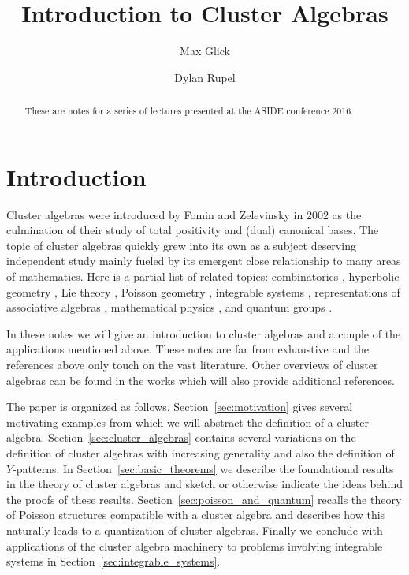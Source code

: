 \documentclass{amsart}
\title{Introduction to Cluster Algebras}
\author{Max Glick}
\author{Dylan Rupel}
\theoremstyle{definition}
\theoremstyle{remark}
\numberwithin{equation}{section}
\begin{document}
\begin{abstract}
  These are notes for a series of lectures presented at the ASIDE conference 2016.
\end{abstract}
\maketitle

\section{Introduction}
  Cluster algebras were introduced by Fomin and Zelevinsky \cite{FZ02} in 2002 as the culmination of their study of total positivity \cite{FZ99} and (dual) canonical bases.  The topic of cluster algebras quickly grew into its own as a subject deserving independent study mainly fueled by its emergent close relationship to many areas of mathematics.  Here is a partial list of related topics: combinatorics \cite{MP07}, hyperbolic geometry \cite{FG06,FST08,MSW13}, Lie theory \cite{GLS06}, Poisson geometry \cite{GSV03}, integrable systems \cite{dFK10,G11}, representations of associative algebras \cite{CC06,CK06,BMRRT06,R11,Q12,R15}, mathematical physics \cite{EF12,ABCGPT14}, and quantum groups \cite{K12,GLS13,KQ14,BR15}.

  In these notes we will give an introduction to cluster algebras and a couple of the applications mentioned above.  These notes are far from exhaustive and the references above only touch on the vast literature.  Other overviews of cluster algebras can be found in the works \cite{K10,W13,GLS} which will also provide additional references.

  The paper is organized as follows.  Section~\ref{sec:motivation} gives several motivating examples from which we will abstract the definition of a cluster algebra.  %
	Section~\ref{sec:cluster_algebras} contains several variations on the definition of cluster algebras with increasing generality and also the definition of $Y$-patterns.  In Section~\ref{sec:basic_theorems} we describe the foundational results in the theory of cluster algebras and sketch or otherwise indicate the ideas behind the proofs of these results. Section~\ref{sec:poisson_and_quantum} recalls the theory of Poisson structures compatible with a cluster algebra and describes how this naturally leads to a quantization of cluster algebras.  Finally we conclude with applications of the cluster algebra machinery to problems involving integrable systems in Section~\ref{sec:integrable_systems}.
\end{document}
